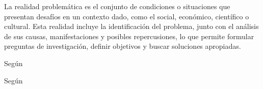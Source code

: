 

La realidad problemática es el conjunto de condiciones o situaciones que presentan desafíos en un contexto dado, como el social, económico, científico o cultural. Esta realidad incluye la identificación del problema, junto con el análisis de sus causas, manifestaciones y posibles repercusiones, lo que permite formular preguntas de investigación, definir objetivos y buscar soluciones apropiadas.

Según \textcite{SDRChileWeb:online} \lipsum[1]

Según \textcite[12]{SDRChileWeb:online} \lipsum[2]
